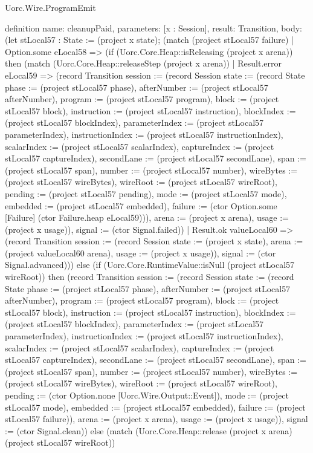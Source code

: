 \begin{lexlean}{Uorc.Wire.ProgramEmit}
\begin{semanticmodule}
definition{
  name: cleanupPaid,
  parameters: [x : Session],
  result: Transition,
  body: (let stLocal57 : State := (project x state); (match (project stLocal57 failure)
    | Option.some eLocal58 => (if (Uorc.Core.Heap::isReleasing (project x arena)) then (match (Uorc.Core.Heap::releaseStep (project x arena))
      | Result.error eLocal59 => (record Transition {session := (record Session {state := (record State {phase := (project stLocal57 phase), afterNumber := (project stLocal57 afterNumber), program := (project stLocal57 program), block := (project stLocal57 block), instruction := (project stLocal57 instruction), blockIndex := (project stLocal57 blockIndex), parameterIndex := (project stLocal57 parameterIndex), instructionIndex := (project stLocal57 instructionIndex), scalarIndex := (project stLocal57 scalarIndex), captureIndex := (project stLocal57 captureIndex), secondLane := (project stLocal57 secondLane), span := (project stLocal57 span), number := (project stLocal57 number), wireBytes := (project stLocal57 wireBytes), wireRoot := (project stLocal57 wireRoot), pending := (project stLocal57 pending), mode := (project stLocal57 mode), embedded := (project stLocal57 embedded), failure := (ctor Option.some [Failure] (ctor Failure.heap eLocal59))}), arena := (project x arena), usage := (project x usage)}), signal := (ctor Signal.failed)})
      | Result.ok valueLocal60 => (record Transition {session := (record Session {state := (project x state), arena := (project valueLocal60 arena), usage := (project x usage)}), signal := (ctor Signal.advanced)})) else (if (Uorc.Core.RuntimeValue::isNull (project stLocal57 wireRoot)) then (record Transition {session := (record Session {state := (record State {phase := (project stLocal57 phase), afterNumber := (project stLocal57 afterNumber), program := (project stLocal57 program), block := (project stLocal57 block), instruction := (project stLocal57 instruction), blockIndex := (project stLocal57 blockIndex), parameterIndex := (project stLocal57 parameterIndex), instructionIndex := (project stLocal57 instructionIndex), scalarIndex := (project stLocal57 scalarIndex), captureIndex := (project stLocal57 captureIndex), secondLane := (project stLocal57 secondLane), span := (project stLocal57 span), number := (project stLocal57 number), wireBytes := (project stLocal57 wireBytes), wireRoot := (project stLocal57 wireRoot), pending := (ctor Option.none [Uorc.Wire.Output::Event]), mode := (project stLocal57 mode), embedded := (project stLocal57 embedded), failure := (project stLocal57 failure)}), arena := (project x arena), usage := (project x usage)}), signal := (ctor Signal.clean)}) else (match (Uorc.Core.Heap::release (project x arena) (project stLocal57 wireRoot))
}
\end{semanticmodule}
\end{lexlean}
